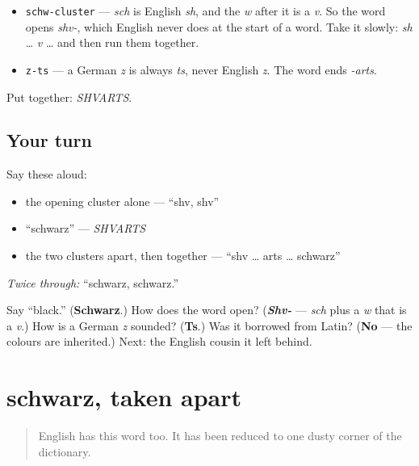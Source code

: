 \begin{sounds}
\begin{itemize}
\raggedright
  \item \texttt{schw-cluster} — \emph{sch} is English \emph{sh}, and the \emph{w} after it is a \emph{v}. So the word opens \emph{shv-}, which English never does at the start of a word. Take it slowly: \emph{sh} … \emph{v} … and then run them together.
  \item \texttt{z-ts} — a German \emph{z} is always \emph{ts}, never English \emph{z}. The word ends \emph{-arts}.
\end{itemize}

Put together: \emph{SHVARTS}.
\end{sounds}

\subsection*{Your turn}
Say these aloud:

\begin{itemize}
\raggedright
  \item the opening cluster alone — \textquotedblleft{}shv, shv\textquotedblright{}
  \item \textquotedblleft{}schwarz\textquotedblright{} — \emph{SHVARTS}
  \item the two clusters apart, then together — \textquotedblleft{}shv … arts … schwarz\textquotedblright{}
\end{itemize}

\emph{Twice through:} \textquotedblleft{}schwarz, schwarz.\textquotedblright{}

\begin{tcolorbox}[breakable,colback=teal!4,colframe=teal!35!black,title={Before you move on}]
Say \textquotedblleft{}black.\textquotedblright{} (\textbf{Schwarz}.) How does the word open? (\emph{\textbf{Shv-}} — \emph{sch} plus a \emph{w} that is a \emph{v}.) How is a German \emph{z} sounded? (\textbf{Ts}.) Was it borrowed from Latin? (\textbf{No} — the colours are inherited.) Next: the English cousin it left behind.
\end{tcolorbox}
\section[schwarz und swarthy]{schwarz, taken apart}

\label{lesson:GE-C13-schwarz-swarthy}



\begin{quote}
English has this word too. It has been reduced to one dusty corner of the dictionary.
\end{quote}

